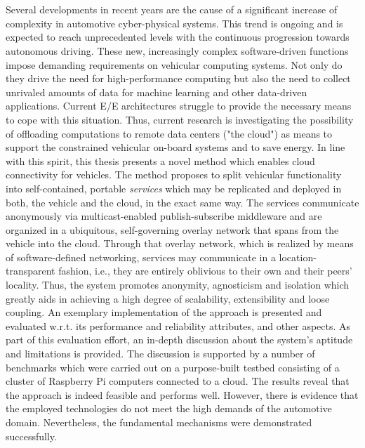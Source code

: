 \chapter{\abstractname}
Several developments in recent years are the cause of a significant increase of complexity in automotive cyber-physical systems. This trend is ongoing and is expected to reach unprecedented levels with the continuous progression towards autonomous driving. These new, increasingly complex software-driven functions impose demanding requirements on vehicular computing systems. Not only do they drive the need for high-performance computing but also the need to collect unrivaled amounts of data for machine learning and other data-driven applications. Current E/E architectures struggle to provide the necessary means to cope with this situation. Thus, current research is investigating the possibility of offloading computations to remote data centers ("the cloud") as means to support the constrained vehicular on-board systems and to save energy. 
In line with this spirit, this thesis presents a novel method which enables cloud connectivity for vehicles.
The method proposes to split vehicular functionality into self-contained, portable \emph{services} which may be replicated and deployed in both, the vehicle and the cloud, in the exact same way. The services communicate anonymously via multicast-enabled publish-subscribe middleware and are organized in a ubiquitous, self-governing overlay network that spans from the vehicle into the cloud. Through that overlay network, which is realized by means of software-defined networking, services may communicate in a location-transparent fashion, i.e., they are entirely oblivious to their own and their peers' locality. 
Thus, the system promotes anonymity, agnosticism and isolation which greatly aids in achieving a high degree of scalability, extensibility and loose coupling. 
An exemplary implementation of the approach is presented and evaluated w.r.t. its performance and reliability attributes, and other aspects. 
As part of this evaluation effort, an in-depth discussion about the system's aptitude and limitations is provided. The discussion is supported by a number of benchmarks which were carried out on a purpose-built testbed consisting of a cluster of Raspberry Pi computers connected to a cloud. The results reveal that the approach is indeed feasible and performs well. However, there is evidence that the employed technologies do not meet the high demands of the automotive domain. Nevertheless, the fundamental mechanisms were demonstrated successfully. 

